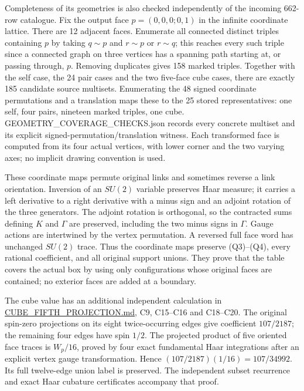\documentclass[11pt]{article}
\begin{document}
Completeness of its geometries is also checked independently of the incoming 662-row catalogue. Fix the output face \(p=(0,0,0;0,1)\) in the infinite coordinate lattice. There are 12 adjacent faces. Enumerate all connected distinct triples containing \(p\) by taking \(q\sim p\) and \(r\sim p\) or \(r\sim q\); this reaches every such triple since a connected graph on three vertices has a spanning path starting at, or passing through, \(p\). Removing duplicates gives 158 marked triples. Together with the self case, the 24 pair cases and the two five-face cube cases, there are exactly 185 candidate source multisets. Enumerating the 48 signed coordinate permutations and a translation maps these to the 25 stored representatives: one self, four pairs, nineteen marked triples, one cube. GEOMETRY\_COVERAGE\_CHECKS.json records every concrete multiset and its explicit signed-permutation/translation witness. Each transformed face is computed from its four actual vertices, with lower corner and the two varying axes; no implicit drawing convention is used.

These coordinate maps permute original links and sometimes reverse a link orientation. Inversion of an \(SU(2)\) variable preserves Haar measure; it carries a left derivative to a right derivative with a minus sign and an adjoint rotation of the three generators. The adjoint rotation is orthogonal, so the contracted sums defining \(K\) and \(\Gamma\) are preserved, including the two minus signs in \(\Gamma\). Gauge actions are intertwined by the vertex permutation. A reversed full face word has unchanged \(SU(2)\) trace. Thus the coordinate maps preserve (Q3)–(Q4), every rational coefficient, and all original support unions. They prove that the table covers the actual box by using only configurations whose original faces are contained; no exterior faces are added at a boundary.

The cube value has an additional independent calculation in \href{https://github.com/KokunoYumeto/yang-mills-interacting-workbench/blob/main/yang-mills/continuations/20261011-central-signs-shrinking-window/fourth_return/cube_derivation/CUBE_FIFTH_PROJECTION.md}{CUBE\_FIFTH\_PROJECTION.md}, C9, C15–C16 and C18–C20. The original spin-zero projections on its eight twice-occurring edges give coefficient \(107/2187\); the remaining four edges have spin \(1/2\). The projected product of five oriented face traces is \(W_p/16\), proved by four exact fundamental Haar integrations after an explicit vertex gauge transformation. Hence \((107/2187)(1/16)=107/34992\). Its full twelve-edge union label is preserved. The independent subset recurrence and exact Haar cubature certificates accompany that proof.
\end{document}
